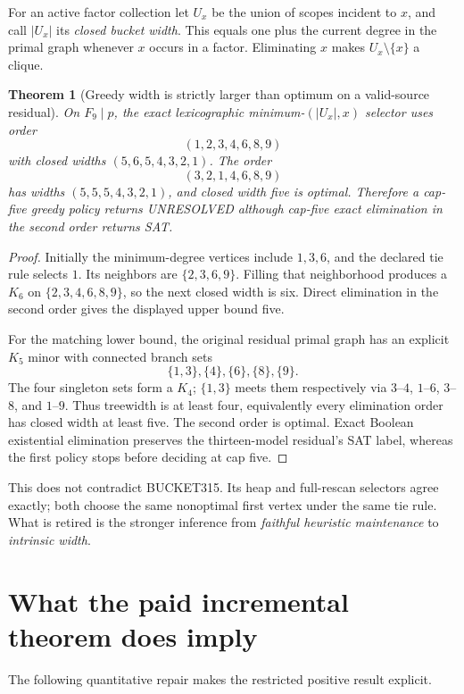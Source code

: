 \documentclass[11pt]{article}
\newtheorem{theorem}{Theorem}
\begin{document}
For an active factor collection let $U_x$ be the union of scopes incident to $x$, and call $|U_x|$ its \emph{closed bucket width}.  This equals one plus the current degree in the primal graph whenever $x$ occurs in a factor.  Eliminating $x$ makes $U_x\setminus\{x\}$ a clique.

\begin{theorem}[Greedy width is strictly larger than optimum on a valid-source residual]\label{thm:gap}
On $F_9\mid p$, the exact lexicographic minimum-$(|U_x|,x)$ selector uses order
\[
(1,2,3,4,6,8,9)
\]
with closed widths $(5,6,5,4,3,2,1)$.  The order
\[
(3,2,1,4,6,8,9)
\]
has widths $(5,5,5,4,3,2,1)$, and closed width five is optimal.  Therefore a cap-five greedy policy returns UNRESOLVED although cap-five exact elimination in the second order returns SAT.
\end{theorem}
\begin{proof}
Initially the minimum-degree vertices include $1,3,6$, and the declared tie rule selects $1$.  Its neighbors are $\{2,3,6,9\}$.  Filling that neighborhood produces a $K_6$ on $\{2,3,4,6,8,9\}$, so the next closed width is six.  Direct elimination in the second order gives the displayed upper bound five.

For the matching lower bound, the original residual primal graph has an explicit $K_5$ minor with connected branch sets
\[
\{1,3\},\{4\},\{6\},\{8\},\{9\}.
\]
The four singleton sets form a $K_4$; $\{1,3\}$ meets them respectively via $3$--$4$, $1$--$6$, $3$--$8$, and $1$--$9$.  Thus treewidth is at least four, equivalently every elimination order has closed width at least five.  The second order is optimal.  Exact Boolean existential elimination preserves the thirteen-model residual's SAT label, whereas the first policy stops before deciding at cap five.
\end{proof}

This does not contradict BUCKET315.  Its heap and full-rescan selectors agree exactly; both choose the same nonoptimal first vertex under the same tie rule.  What is retired is the stronger inference from \emph{faithful heuristic maintenance} to \emph{intrinsic width}.

\section{What the paid incremental theorem does imply}
The following quantitative repair makes the restricted positive result explicit.
\end{document}

